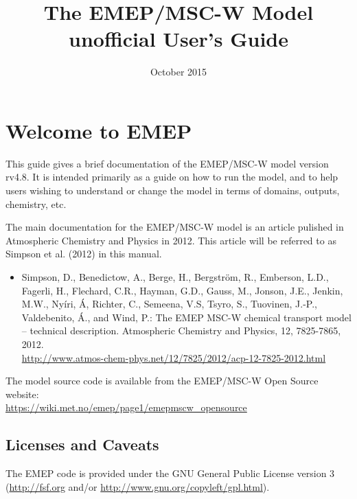 \documentclass[a4paper,12pt]{report}
\begin{document}

\title{{\huge The EMEP/MSC-W Model }\\
{\Large unofficial User's Guide}}

\date{October 2015}
\maketitle

\tableofcontents
\setcounter{page}{0}

\chapter{Welcome to EMEP }

This guide gives a brief documentation of the EMEP/MSC-W model
version rv4.8. 
It is intended primarily as a guide on how to run the model, and
to help users wishing to understand or change 
the model in terms of domains, outputs, chemistry, etc.


The main documentation for the EMEP/MSC-W model is an article pulished 
in Atmospheric Chemistry and Physics in 2012. 
This article will be referred to as Simpson et al. (2012) in
this manual. 


\begin{itemize}
\item
Simpson, D., Benedictow, A., Berge, H., Bergstr\"om, R., Emberson, L.D., Fagerli, H., Flechard, C.R., Hayman, G.D., Gauss, M., Jonson, J.E., Jenkin, M.W., Ny\'iri, \'A, Richter, C., Semeena, V.S, Tsyro, S., Tuovinen, J.-P., Valdebenito, \'A., and Wind, P.:
The EMEP MSC-W chemical transport model – technical description.  
Atmospheric Chemistry and Physics, 12, 7825-7865, 2012. \\
\url{http://www.atmos-chem-phys.net/12/7825/2012/acp-12-7825-2012.html}
\end{itemize}


The model source code is available from the EMEP/MSC-W Open Source website:\\ 
\url{https://wiki.met.no/emep/page1/emepmscw_opensource}

\newpage

\section{Licenses and Caveats}

The EMEP code is provided under the GNU General Public License version 3
(\url{http://fsf.org} and/or
\url{http://www.gnu.org/copyleft/gpl.html}).
\end{document}
